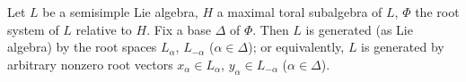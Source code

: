 Let $L$ be a semisimple Lie algebra, $H$ a maximal toral subalgebra of $L$, $\Phi$ the root system of $L$ relative to $H$. Fix a base $\Delta$ of $\Phi$. Then $L$ is generated (as Lie algebra) by the root spaces $L_\alpha$, $L_{-\alpha}$ ($\alpha \in \Delta$); or equivalently, $L$ is generated by arbitrary nonzero root vectors $x_\alpha \in L_\alpha$, $y_\alpha \in L_{-\alpha}$ ($\alpha \in \Delta$).